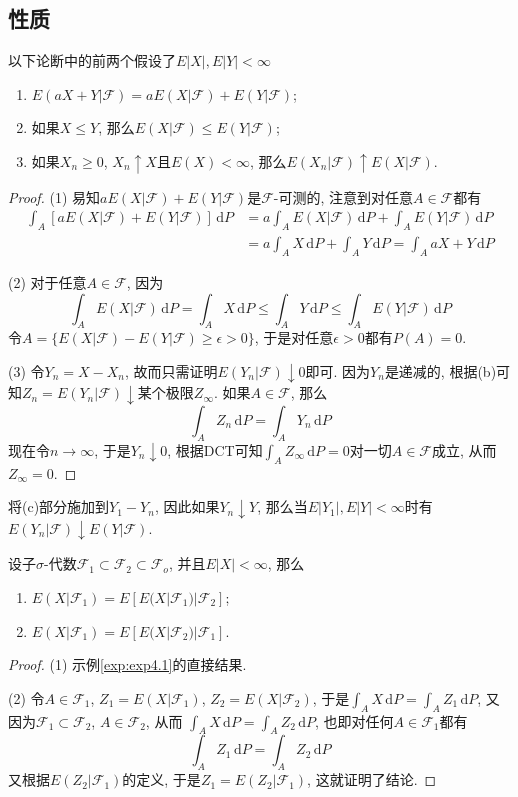\documentclass[cn, 12pt, math=mtpro2, bibstyle=apa, blue, twocol]{elegantbook}
\newcommand{\F}{\mathcal{F}}
\begin{document}
\subsection{性质}
\begin{theorem}\label{thm:thm4.1}
  以下论断中的前两个假设了$E|X|, E|Y|<\infty$
  \begin{enumerate}[label=(\arabic*)]
    \item $E(aX+Y|\F)=aE(X|\F)+E(Y|\F)$;
    \item 如果$X\leq Y$, 那么$E(X|\F)\leq E(Y|\F)$;
    \item 如果$X_n\ge0$, $X_n\uparrow X$且$E(X)<\infty$, 那么$E(X_n|\F)\uparrow E(X|\F)$.
  \end{enumerate}
\end{theorem}
\begin{proof}
  (1) 易知$aE(X|\F)+E(Y|\F)$是$\F$-可测的, 注意到对任意$A\in\F$都有
  \begin{align*}
  \int_A[aE(X|\F)+E(Y|\F)]\,\text{d}P&=a\int_AE(X|\F)\,\text{d}P+\int_AE(Y|\F)\,\text{d}P \\
  &=a\int_AX\,\text{d}P+\int_AY\,\text{d}P=\int_A aX+Y\,\text{d}P
  \end{align*}

  (2) 对于任意$A\in\F$, 因为
  $$\int_AE(X|\F)\,\text{d}P=\int_AX\,\text{d}P\leq\int_AY\,\text{d}P\leq\int_AE(Y|\F)\,\text{d}P$$
  令$A=\{E(X|\F)-E(Y|\F)\ge\epsilon>0\}$, 于是对任意$\epsilon>0$都有$P(A)=0$.

  (3) 令$Y_n=X-X_n$, 故而只需证明$E(Y_n|\F)\downarrow 0$即可. 因为$Y_n$是递减的, 根据(b)可知$Z_n=E(Y_n|\F)\downarrow$某个极限$Z_\infty$. 如果$A\in\F$, 那么
  $$\int_AZ_n\,\text{d}P=\int_AY_n\,\text{d}P$$
  现在令$n\to\infty$, 于是$Y_n\downarrow 0$, 根据DCT可知$\int_AZ_\infty\,\text{d}P=0$对一切$A\in\F$成立, 从而$Z_\infty=0$.
\end{proof}
\begin{remark}
将(c)部分施加到$Y_1-Y_n$, 因此如果$Y_n\downarrow Y$, 那么当$E|Y_1|, E|Y|<\infty$时有$E(Y_n|\F)\downarrow E(Y|\F)$.
\end{remark}

\begin{theorem}\label{thm:thm4.2}
  设子$\sigma$-代数$\F_1\subset\F_2\subset\F_o$, 并且$E|X|<\infty$, 那么
  \begin{enumerate}[label=(\arabic*)]
    \item $E(X|\F_1)=E[E(X|\F_1)|\F_2]$;
    \item $E(X|\F_1)=E[E(X|\F_2)|\F_1]$.
  \end{enumerate}
\end{theorem}
\begin{proof}
  (1) 示例\ref{exp:exp4.1}的直接结果.

  (2) 令$A\in\F_1$, $Z_1=E(X|\F_1)$, $Z_2=E(X|\F_2)$, 于是$\int_AX\,\text{d}P=\int_AZ_1\,\text{d}P$,
  又因为$\F_1\subset\F_2$, $A\in\F_2$, 从而
  $\int_AX\,\text{d}P=\int_AZ_2\,\text{d}P$, 也即对任何$A\in\F_1$都有
  $$\int_AZ_1\,\text{d}P=\int_AZ_2\,\text{d}P$$
  又根据$E(Z_2|\F_1)$的定义, 于是$Z_1=E(Z_2|\F_1)$, 这就证明了结论.
\end{proof}
\end{document}
